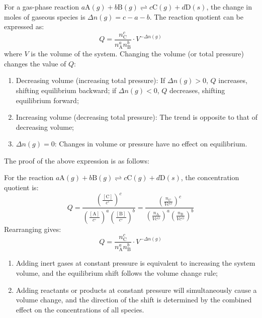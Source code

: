\begin{proposition}
For a gas-phase reaction $a\text{A}(g) + b\text{B}(g) \rightleftharpoons c\text{C}(g) + d\text{D}(s)$, the change in moles of gaseous species is $\Delta n(g) = c - a - b$. The reaction quotient can be expressed as:
$$Q = \frac{n_{\text{C}}^c}{n_{\text{A}}^a n_{\text{B}}^b} \cdot V^{-\Delta n(g)}$$
where $V$ is the volume of the system. Changing the volume (or total pressure) changes the value of $Q$:
\begin{enumerate}
    \item Decreasing volume (increasing total pressure): If $\Delta n(g) > 0$, $Q$ increases, shifting equilibrium backward; if $\Delta n(g) < 0$, $Q$ decreases, shifting equilibrium forward;
    \item Increasing volume (decreasing total pressure): The trend is opposite to that of decreasing volume;
    \item $\Delta n(g) = 0$: Changes in volume or pressure have no effect on equilibrium.
\end{enumerate}
\end{proposition}

The proof of the above expression is as follows:

For the reaction $a\text{A}(g) + b\text{B}(g) \rightleftharpoons c\text{C}(g) + d\text{D}(s)$, the concentration quotient is:
$$Q = \frac{\left(\frac{[\text{C}]}{c^\circ}\right)^c}{\left(\frac{[\text{A}]}{c^\circ}\right)^a \left(\frac{[\text{B}]}{c^\circ}\right)^b} = \frac{\left(\frac{n_{\text{C}}}{V c^\ominus}\right)^c}{\left(\frac{n_{\text{A}}}{V c^\ominus}\right)^a \left(\frac{n_{\text{B}}}{V c^\ominus}\right)^b}$$
Rearranging gives:
$$Q = \frac{n_{\text{C}}^c}{n_{\text{A}}^a n_{\text{B}}^b} \cdot V^{-\Delta n(g)}$$

\begin{proposition}
\begin{enumerate}
    \item Adding inert gases at constant pressure is equivalent to increasing the system volume, and the equilibrium shift follows the volume change rule;
    \item Adding reactants or products at constant pressure will simultaneously cause a volume change, and the direction of the shift is determined by the combined effect on the concentrations of all species.
\end{enumerate}
\end{proposition}

